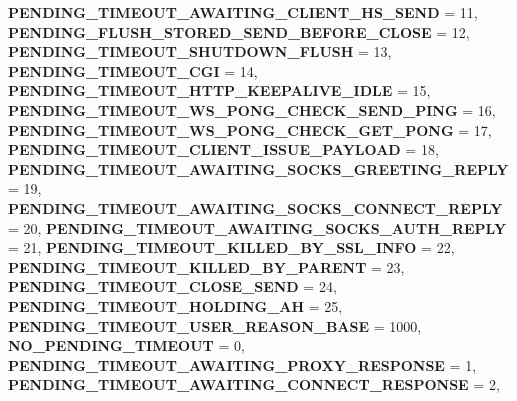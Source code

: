 \begin{DoxyCompactItemize}
\newline
{\bfseries P\+E\+N\+D\+I\+N\+G\+\_\+\+T\+I\+M\+E\+O\+U\+T\+\_\+\+A\+W\+A\+I\+T\+I\+N\+G\+\_\+\+C\+L\+I\+E\+N\+T\+\_\+\+H\+S\+\_\+\+S\+E\+ND} = 11, 
{\bfseries P\+E\+N\+D\+I\+N\+G\+\_\+\+F\+L\+U\+S\+H\+\_\+\+S\+T\+O\+R\+E\+D\+\_\+\+S\+E\+N\+D\+\_\+\+B\+E\+F\+O\+R\+E\+\_\+\+C\+L\+O\+SE} = 12, 
{\bfseries P\+E\+N\+D\+I\+N\+G\+\_\+\+T\+I\+M\+E\+O\+U\+T\+\_\+\+S\+H\+U\+T\+D\+O\+W\+N\+\_\+\+F\+L\+U\+SH} = 13, 
{\bfseries P\+E\+N\+D\+I\+N\+G\+\_\+\+T\+I\+M\+E\+O\+U\+T\+\_\+\+C\+GI} = 14, 
\newline
{\bfseries P\+E\+N\+D\+I\+N\+G\+\_\+\+T\+I\+M\+E\+O\+U\+T\+\_\+\+H\+T\+T\+P\+\_\+\+K\+E\+E\+P\+A\+L\+I\+V\+E\+\_\+\+I\+D\+LE} = 15, 
{\bfseries P\+E\+N\+D\+I\+N\+G\+\_\+\+T\+I\+M\+E\+O\+U\+T\+\_\+\+W\+S\+\_\+\+P\+O\+N\+G\+\_\+\+C\+H\+E\+C\+K\+\_\+\+S\+E\+N\+D\+\_\+\+P\+I\+NG} = 16, 
{\bfseries P\+E\+N\+D\+I\+N\+G\+\_\+\+T\+I\+M\+E\+O\+U\+T\+\_\+\+W\+S\+\_\+\+P\+O\+N\+G\+\_\+\+C\+H\+E\+C\+K\+\_\+\+G\+E\+T\+\_\+\+P\+O\+NG} = 17, 
{\bfseries P\+E\+N\+D\+I\+N\+G\+\_\+\+T\+I\+M\+E\+O\+U\+T\+\_\+\+C\+L\+I\+E\+N\+T\+\_\+\+I\+S\+S\+U\+E\+\_\+\+P\+A\+Y\+L\+O\+AD} = 18, 
\newline
{\bfseries P\+E\+N\+D\+I\+N\+G\+\_\+\+T\+I\+M\+E\+O\+U\+T\+\_\+\+A\+W\+A\+I\+T\+I\+N\+G\+\_\+\+S\+O\+C\+K\+S\+\_\+\+G\+R\+E\+E\+T\+I\+N\+G\+\_\+\+R\+E\+P\+LY} = 19, 
{\bfseries P\+E\+N\+D\+I\+N\+G\+\_\+\+T\+I\+M\+E\+O\+U\+T\+\_\+\+A\+W\+A\+I\+T\+I\+N\+G\+\_\+\+S\+O\+C\+K\+S\+\_\+\+C\+O\+N\+N\+E\+C\+T\+\_\+\+R\+E\+P\+LY} = 20, 
{\bfseries P\+E\+N\+D\+I\+N\+G\+\_\+\+T\+I\+M\+E\+O\+U\+T\+\_\+\+A\+W\+A\+I\+T\+I\+N\+G\+\_\+\+S\+O\+C\+K\+S\+\_\+\+A\+U\+T\+H\+\_\+\+R\+E\+P\+LY} = 21, 
{\bfseries P\+E\+N\+D\+I\+N\+G\+\_\+\+T\+I\+M\+E\+O\+U\+T\+\_\+\+K\+I\+L\+L\+E\+D\+\_\+\+B\+Y\+\_\+\+S\+S\+L\+\_\+\+I\+N\+FO} = 22, 
\newline
{\bfseries P\+E\+N\+D\+I\+N\+G\+\_\+\+T\+I\+M\+E\+O\+U\+T\+\_\+\+K\+I\+L\+L\+E\+D\+\_\+\+B\+Y\+\_\+\+P\+A\+R\+E\+NT} = 23, 
{\bfseries P\+E\+N\+D\+I\+N\+G\+\_\+\+T\+I\+M\+E\+O\+U\+T\+\_\+\+C\+L\+O\+S\+E\+\_\+\+S\+E\+ND} = 24, 
{\bfseries P\+E\+N\+D\+I\+N\+G\+\_\+\+T\+I\+M\+E\+O\+U\+T\+\_\+\+H\+O\+L\+D\+I\+N\+G\+\_\+\+AH} = 25, 
{\bfseries P\+E\+N\+D\+I\+N\+G\+\_\+\+T\+I\+M\+E\+O\+U\+T\+\_\+\+U\+S\+E\+R\+\_\+\+R\+E\+A\+S\+O\+N\+\_\+\+B\+A\+SE} = 1000, 
\newline
{\bfseries N\+O\+\_\+\+P\+E\+N\+D\+I\+N\+G\+\_\+\+T\+I\+M\+E\+O\+UT} = 0, 
{\bfseries P\+E\+N\+D\+I\+N\+G\+\_\+\+T\+I\+M\+E\+O\+U\+T\+\_\+\+A\+W\+A\+I\+T\+I\+N\+G\+\_\+\+P\+R\+O\+X\+Y\+\_\+\+R\+E\+S\+P\+O\+N\+SE} = 1, 
{\bfseries P\+E\+N\+D\+I\+N\+G\+\_\+\+T\+I\+M\+E\+O\+U\+T\+\_\+\+A\+W\+A\+I\+T\+I\+N\+G\+\_\+\+C\+O\+N\+N\+E\+C\+T\+\_\+\+R\+E\+S\+P\+O\+N\+SE} = 2, 

\end{DoxyCompactItemize}
